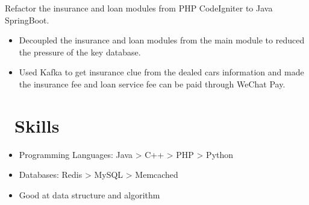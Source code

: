\documentclass{resume}
\begin{document}
Refactor the insurance and loan modules from PHP CodeIgniter to Java SpringBoot.
\begin{itemize}
  \item Decoupled the insurance and loan modules from the main module to reduced the pressure of the key database.
  \item Used Kafka to get insurance clue from the dealed cars information and made the insurance fee and loan service fee can be paid through WeChat Pay.
\end{itemize}

\section{\faCogs\ Skills}
\begin{itemize}[parsep=0.5ex]
  \item Programming Languages: Java > C++ > PHP > Python
  \item Databases: Redis > MySQL > Memcached
  \item Good at data structure and algorithm
\end{itemize}
\end{document}
